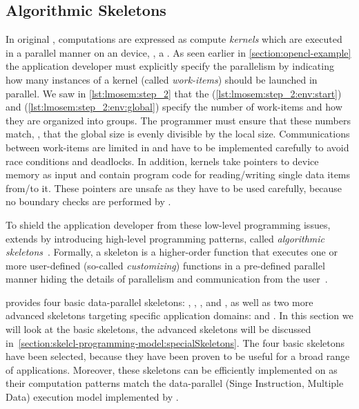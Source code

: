 \subsection{Algorithmic Skeletons}
\label{section:skelcl-programming-model:skeletons}
In original \OpenCL, computations are expressed as compute \emph{kernels} which are executed in a parallel manner on an \OpenCL device, \eg, a \GPU.
As seen earlier in \autoref{section:opencl-example} the application developer must explicitly specify the parallelism by indicating how many instances of a kernel (called \emph{work-items}) should be launched in parallel.
We saw in \autoref{lst:lmosem:step_2} that the  (\autoref{lst:lmosem:step_2:env:start}) and  (\autoref{lst:lmosem:step_2:env:global}) specify the number of work-items and how they are organized into groups.
The programmer must ensure that these numbers match, \ie, that the global size is evenly divisible by the local size.
Communications between work-items are limited in \OpenCL and have to be implemented carefully to avoid race conditions and deadlocks.
In addition, kernels take pointers to device memory as input and contain program code for reading/writing single data items from/to it.
These pointers are unsafe as they have to be used carefully, because no boundary checks are performed by \OpenCL.

To shield the application developer from these low-level programming issues, \SkelCL extends \OpenCL by introducing high-level programming patterns, called \emph{algorithmic skeletons}~\cite{Cole1991}.
Formally, a skeleton is a higher-order function that executes one or more user-defined (so-called \emph{customizing}) functions in a pre-defined parallel manner hiding the details of parallelism and communication from the user~\cite{GorlatchCo2011}.

\SkelCL provides four basic data-parallel skeletons: \map, \zip, \reduce, and \scan,
as well as two more advanced skeletons targeting specific application domains: \stencil and \allpairs.
In this section we will look at the basic skeletons, the advanced skeletons will be discussed in~\autoref{section:skelcl-programming-model:specialSkeletons}.
The four basic skeletons have been selected, because they have been proven to be useful for a broad range of applications.
Moreover, these skeletons can be efficiently implemented on \GPUs as their computation patterns match the data-parallel \SIMD (Singe Instruction, Multiple Data) execution model implemented by \GPUs.

